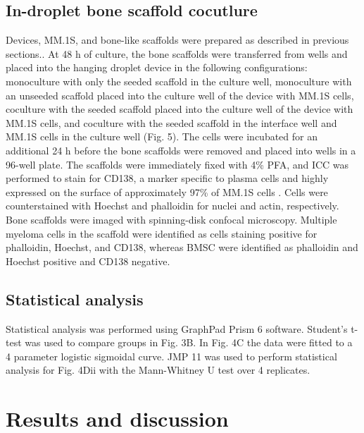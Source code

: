 \subsection{In-droplet bone scaffold cocutlure}
Devices, MM.1S, and bone-like scaffolds were prepared as described in previous sections.. At 48 h of culture, the bone scaffolds were transferred from wells and placed into the hanging droplet device in the following configurations: monoculture with only the seeded scaffold in the culture well, monoculture with an unseeded scaffold placed into the culture well of the device with MM.1S cells, coculture with the seeded scaffold placed into the culture well of the device with MM.1S cells, and coculture with the seeded scaffold in the interface well and MM.1S cells in the culture well (Fig. 5). The cells were incubated for an additional 24 h before the bone scaffolds were removed and placed into wells in a 96-well plate. The scaffolds were immediately fixed with 4\% PFA, and ICC was performed to stain for CD138, a marker specific to plasma cells and highly expressed on the surface of approximately 97\% of MM.1S cells \cite{Paino2014}. Cells were counterstained with Hoechst and phalloidin for nuclei and actin, respectively. Bone scaffolds were imaged with spinning-disk confocal microscopy. Multiple myeloma cells in the scaffold were identified as cells staining positive for phalloidin, Hoechst, and CD138, whereas BMSC were identified as phalloidin and Hoechst positive and CD138 negative.


\subsection{Statistical analysis}
Statistical analysis was performed using GraphPad Prism 6 software. Student’s t-test was used to compare groups in Fig. 3B.  In Fig. 4C the data were fitted to a 4 parameter logistic sigmoidal curve. JMP 11 was used to perform statistical analysis for Fig.  4Dii with the Mann-Whitney U test over 4 replicates.

\section{Results and discussion}
